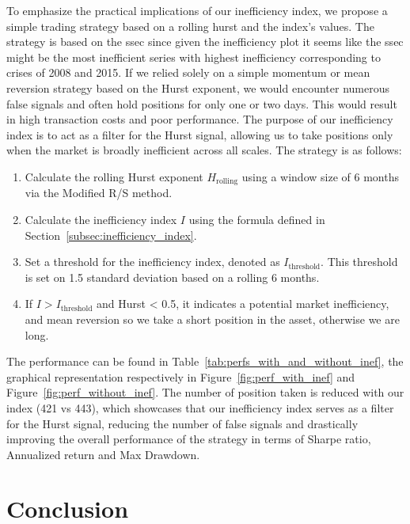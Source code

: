 \documentclass[11pt]{extarticle}
\begin{document}
To emphasize the practical implications of our inefficiency index, we propose a simple trading strategy based on a rolling hurst and the index's values.
The strategy is based on the ssec since given the inefficiency plot it seems like the ssec might be the most inefficient
series with highest inefficiency corresponding to crises of 2008 and 2015.
If we relied solely on a simple momentum or mean reversion strategy based on the Hurst exponent, we would encounter
numerous false signals and often hold positions for only one or two days. This would result in high transaction costs
and poor performance. The purpose of our inefficiency index is to act as a filter for the Hurst signal, allowing us to
take positions only when the market is broadly inefficient across all scales.
The strategy is as follows:
\begin{enumerate}
    \item Calculate the rolling Hurst exponent $H_{\text{rolling}}$ using a window size of 6 months via the Modified R/S method.
    \item Calculate the inefficiency index $I$ using the formula defined in Section~\ref{subsec:inefficiency_index}.
    \item Set a threshold for the inefficiency index, denoted as $I_{\text{threshold}}$. This threshold is set on 1.5 standard deviation based
    on a rolling 6 months.
    \item If $I > I_{\text{threshold}}$ and Hurst < 0.5, it indicates a potential market inefficiency, and mean reversion so we take a short position in the asset, otherwise we are long.
\end{enumerate}
The performance can be found in Table~\ref{tab:perfs_with_and_without_inef}, the graphical representation respectively in Figure~\ref{fig:perf_with_inef} and
Figure~\ref{fig:perf_without_inef}. The number of position taken is reduced with our index (421 vs 443), which showcases that our inefficiency
index serves as a filter for the Hurst signal, reducing the number of false signals and drastically improving the overall
performance of the strategy in terms of Sharpe ratio, Annualized return and Max Drawdown.

\section{Conclusion}
\end{document}
